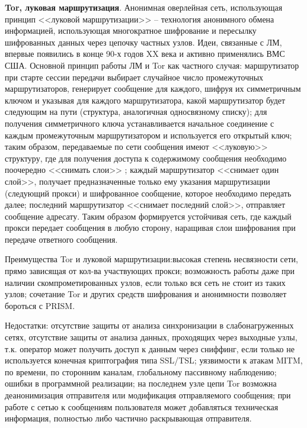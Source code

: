 \textbf{Tor, луковая маршрутизация}. Анонимная оверлейная сеть, использующая принцип <<луковой маршрутизации>> -- технология анонимного обмена информацией, использующая многократное шифрование и пересылку шифрованных данных через цепочку частных узлов. Идеи, связанные с ЛМ, впервые появились в конце 90-х годов XX века и активно применялись ВМС США. Основной принцип работы ЛМ и Tor как частного случая: маршрутизатор при старте сессии  передачи выбирает случайное число промежуточных маршрутизаторов, генерирует сообщение для каждого, шифруя их симметричным ключом и указывая для каждого маршрутизатора, какой маршрутизатор будет следующим на пути (структура, аналогичная односвязному списку); для получения симметричного ключа устанавливается начальное соединение с каждым промежуточным маршрутизатором и используется его открытый ключ; таким образом, передаваемые по сети сообщения имеют <<луковую>> структуру, где для получения доступа к содержимому сообщения необходимо поочередно <<снимать слои>> ; каждый маршрутизатор <<снимает один слой>>, получает предназначенные только ему указания маршрутизации (следующий прокси) и шифрованное сообщение, которое необходимо передать далее; последний маршрутизатор <<снимает последний слой>>, отправляет сообщение адресату. Таким образом формируется устойчивая сеть, где каждый прокси передает сообщения в любую сторону, наращивая слои шифрования при передаче ответного сообщения. \cite{TOR1} %

Преимущества Tor и луковой маршрутизации:высокая степень несвязности сети, прямо зависящая от кол-ва участвующих прокси; возможность работы даже при наличии скомпрометированных узлов, если только вся сеть не стоит из таких узлов; сочетание Tor и других средств шифрования и анонимности позволяет бороться с PRISM. \cite{TOR2} %


Недостатки: отсутствие защиты от анализа синхронизации в слабонагруженных сетях, отсутствие защиты   от анализа данных, проходящих через выходные узлы, т.к. оператор может получить доступ к данным через сниффинг, если только не используется конечная криптография типа SSL/TSL; уязвимости к атакам MITM,  по времени, по сторонним каналам, глобальному пассивному наблюдению;  %
ошибки  в программной реализации; на последнем узле цепи Tor возможна деанонимизация отправителя или модификация отправляемого сообщения;  при работе с сетью  к сообщениям пользователя может добавляться техническая информация, полностью либо частично раскрывающая отправителя. %

